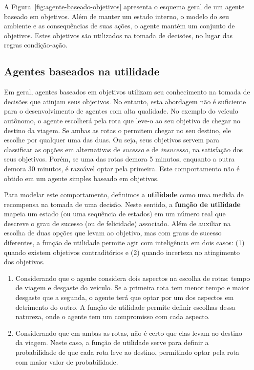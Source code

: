 A Figura~\ref{fig:agente-baseado-objetivos} apresenta o esquema geral de um agente baseado em objetivos. Além de manter um estado interno, o modelo do seu ambiente e as consequências de suas ações, o agente mantém um conjunto de objetivos. Estes objetivos são utilizados na tomada de decisões, no lugar das regras condição-ação.

\subsection{Agentes baseados na utilidade}

Em geral, agentes baseados em objetivos utilizam seu conhecimento na tomada de decisões que atinjam seus objetivos. No entanto, esta abordagem não é suficiente para o desenvolvimento de agentes com alta qualidade. No exemplo do veículo autônomo, o agente escolherá pela rota que leve-o ao seu objetivo de chegar no destino da viagem. Se ambas as rotas o permitem chegar no seu destino, ele escolhe por qualquer uma das duas. Ou seja, seus objetivos servem para classificar as opções em alternativas de \textit{sucesso} e de \textit{insucesso}, na satisfação dos seus objetivos. Porém, se uma das rotas demora 5 minutos, enquanto a outra demora 30 minutos, é razoável optar pela primeira. Este comportamento não é obtido em um agente simples baseado em objetivos.

Para modelar este comportamento, definimos a \textbf{utilidade} como uma medida de recompensa na tomada de uma decisão. Neste sentido, a \textbf{função de utilidade} mapeia um estado (ou uma sequência de estados) em um número real que descreve o grau de sucesso (ou de felicidade) associado. Além de auxiliar na escolha de duas opções que levam ao objetivo, mas com graus de sucesso diferentes, a função de utilidade permite agir com inteligência em dois casos: (1) quando existem objetivos contraditórios e (2) quando incerteza no atingimento dos objetivos.
\begin{enumerate}[(1)]
	\item Considerando que o agente considera dois aspectos na escolha de rotas: tempo de viagem e desgaste do veículo. Se a primeira rota tem menor tempo e maior desgaste que a segunda, o agente terá que optar por um dos aspectos em detrimento do outro. A função de utilidade permite definir escolhas dessa natureza, onde o agente tem um compromisso com cada aspecto.
	\item Considerando que em ambas as rotas, não é certo que elas levam ao destino da viagem. Neste caso, a função de utilidade serve para definir a probabilidade de que cada rota leve ao destino, permitindo optar pela rota com maior valor de probabilidade.
\end{enumerate}

